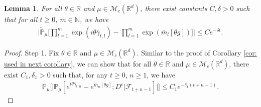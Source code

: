 \documentclass[12pt,a4paper]{amsart}
\theoremstyle{plain}
\newtheorem{lem}[thm]{Lemma}
\theoremstyle{definition}
\numberwithin{equation}{section}
\begin{document}
\begin{lem}\label{lem: independency for large rate}
    For all $\theta\in \mathbb{R}$ and $\mu \in \mathcal{M}_c(\mathbb{R}^d)$, there exist constants $C,\delta>0$ such that for all $t\geq 0$, $m\in\mathbb{N}$, we have
\begin{align}\label{ineq: next we will need}
    \bigg|\tilde{\mathbb{P}}_{\mu}\Big[\prod_{l=1}^m\exp(i\theta\bar{\gamma}_{t,l})-\prod_{l=1}^m\exp(\bar{m}_l[\theta g])\Big]\bigg|\leq C e^{-\delta t}.
\end{align}
\end{lem}
\begin{proof}
    Step 1. Fix $\theta \in \mathbb R$ and $\mu \in \mathcal M_c(\mathbb R^d)$.
    Similar to the proof of Corollary \ref{cor: used in next corollary}, we can show that  for all $\theta\in \mathbb{R}$ and $\mu\in \mathcal{M}_c(\mathbb{R}^d)$, there exist $C_1,\delta_1>0$ such that, for any $t\geq 0$, $n\geq 1$, we have
\begin{align}
    \mathbb{P}_{\mu}\Big[\big|\mathbb{P}_{\mu}[e^{i\theta\bar{\gamma}_{t,n}}-e^{\bar{m}_n[\theta g]}; D^c | \mathscr F_{t+n-1}]\big|\Big]\leq C_1e^{-\delta_1(t+n-1)}.
\end{align}


\end{proof}
\end{document}
